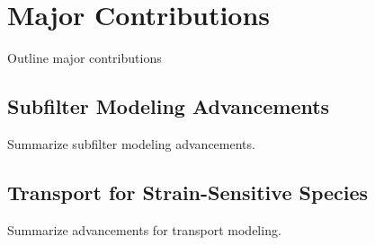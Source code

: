 \section{Major Contributions}
\label{sec:conclusion:contributions}

Outline major contributions


\subsection{Subfilter Modeling Advancements}
\label{sec:conclusion:contributions:subfilter}

Summarize subfilter modeling advancements.


\subsection{Transport for Strain-Sensitive Species}
\label{sec:conclusion:contributions:transport}

Summarize advancements for transport modeling.
